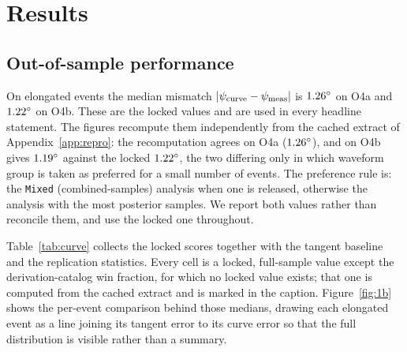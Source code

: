 \documentclass[aps,prd,twocolumn,amsmath,amssymb,nofootinbib,superscriptaddress]{revtex4-2}
\begin{document}
\section{Results}
\label{sec:results}

\subsection{Out-of-sample performance}
\label{sec:oos}
On elongated events the median mismatch $|\psi_{\rm curve}-\psi_{\rm meas}|$ is
$1.26^\circ$ on O4a and $1.22^\circ$ on O4b. These are the locked values
and are used in every headline statement. The figures recompute them independently from the cached
extract of Appendix~\ref{app:repro}: the recomputation agrees on O4a ($1.26^\circ$), and on O4b
gives $1.19^\circ$ against the locked $1.22^\circ$, the two differing only in
which waveform group is taken as preferred for a small number of events. The preference rule is: the
\texttt{Mixed} (combined-samples) analysis when one is released, otherwise the analysis with the most
posterior samples. We report both values rather than reconcile them, and use the locked one throughout.

Table~\ref{tab:curve} collects the locked scores together with the tangent baseline and the replication
statistics. Every cell is a locked, full-sample value except the derivation-catalog win fraction, for
which no locked value exists; that one is computed from the cached extract and is marked in the caption.
Figure~\ref{fig:1b} shows the per-event comparison behind those medians, drawing each elongated event as a line joining its
tangent error to its curve error so that the full distribution is visible rather than a summary.
\end{document}
